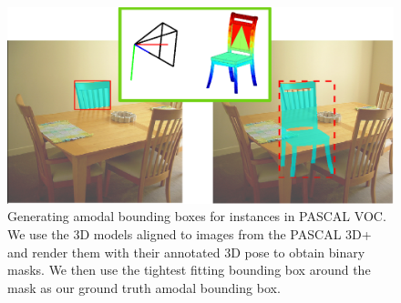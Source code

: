 \begin{figure}
  \centering
  \includegraphics[width=.9\linewidth]{figures/amodal/Amodal.png}
  \caption{ Generating amodal bounding boxes for instances in PASCAL VOC. We use the 3D models aligned to images from the PASCAL 3D+ \cite{pascal3d} and render them with their annotated 3D pose to obtain binary masks. We then use the tightest fitting bounding box around the mask as our ground truth amodal bounding box.}
\end{figure}

